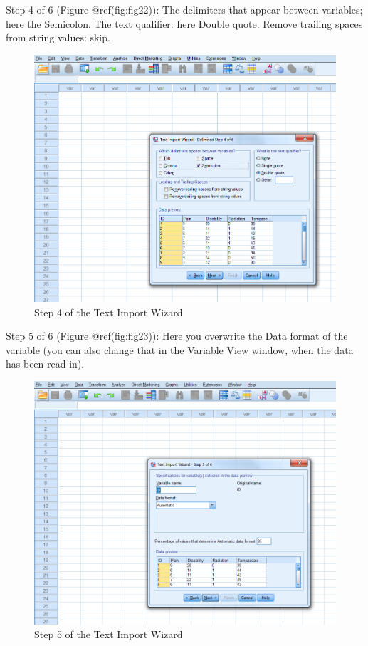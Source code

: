 \documentclass[
]{book}
\begin{document}
Step 4 of 6 (Figure @ref(fig:fig22)): The delimiters that appear between
variables; here the Semicolon. The text qualifier: here Double quote.
Remove trailing spaces from string values: skip.

\begin{figure}

{\centering \includegraphics[width=0.95\linewidth]{images/fig1.22} 

}

\caption{Step 4 of the Text Import Wizard}\label{fig:fig22}
\end{figure}

Step 5 of 6 (Figure @ref(fig:fig23)): Here you overwrite the Data format
of the variable (you can also change that in the Variable View window,
when the data has been read in).

\begin{figure}

{\centering \includegraphics[width=0.95\linewidth]{images/fig1.23} 

}

\caption{Step 5 of the Text Import Wizard}\label{fig:fig23}
\end{figure}
\end{document}
